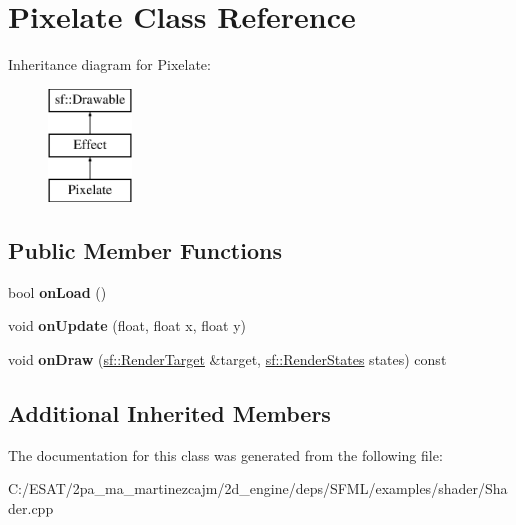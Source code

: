 \hypertarget{class_pixelate}{}\section{Pixelate Class Reference}
\label{class_pixelate}
Inheritance diagram for Pixelate\+:\begin{figure}[H]
\begin{center}
\leavevmode
\includegraphics[height=3.000000cm]{class_pixelate}
\end{center}
\end{figure}
\subsection*{Public Member Functions}
\begin{DoxyCompactItemize}
\item 
\mbox{\label{class_pixelate_a815d873c5d41fe57af715965b4f2fbbd}} 
bool {\bfseries on\+Load} ()
\item 
\mbox{\label{class_pixelate_a78dd551e6e8cf39326acb1131b4964fe}} 
void {\bfseries on\+Update} (float, float x, float y)
\item 
\mbox{\label{class_pixelate_ad700c97025a7645098e3bdb7577ed939}} 
void {\bfseries on\+Draw} (\hyperlink{classsf_1_1_render_target}{sf\+::\+Render\+Target} \&target, \hyperlink{classsf_1_1_render_states}{sf\+::\+Render\+States} states) const
\end{DoxyCompactItemize}
\subsection*{Additional Inherited Members}


The documentation for this class was generated from the following file\+:\begin{DoxyCompactItemize}
\item 
C\+:/\+E\+S\+A\+T/2pa\+\_\+ma\+\_\+martinezcajm/2d\+\_\+engine/deps/\+S\+F\+M\+L/examples/shader/Shader.\+cpp\end{DoxyCompactItemize}
